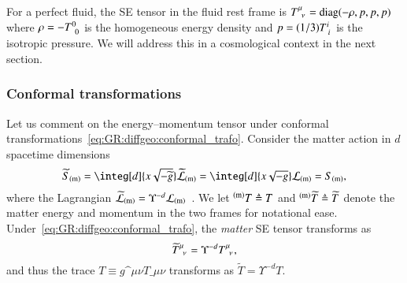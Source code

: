    For a perfect fluid, the SE tensor in the fluid rest frame is $T\indices{^\mu_\nu}= \text{diag}(-\rho, p, p, p)$ where $\rho=-T\iud{0}{0}$ is the homogeneous energy density and $p= (1/3) T\iud{i}{i}$ is the isotropic pressure. We will address this in a cosmological context in the next section.


    \subsubsection{Conformal transformations}
        {
        \newcommand\cfac{\Upsilon}
        \newcommand\wt{\widetilde}
        Let us comment on the energy--momentum tensor under conformal transformations~\cref{eq:GR:diffgeo:conformal_trafo}. Consider the matter action in $d$ spacetime dimensions
        \begin{equation}\label{eq:GR:einstein:matter_action_conformal}
            \widetilde{S}\ped{(m)} = \integ[d]{x\sqrt{-\wt{g}}} \wt{\mathcal{L}}\ped{(m)} = \integ[d]{x\sqrt{-g}} \mathcal{L}\ped{(m)} = S\ped{(m)},
        \end{equation}
        where the Lagrangian $\wt{\mathcal{L}}\ped{(m)}=\Upsilon^{-d}\mathcal{L}\ped{(m)}$~\citep{dabrowskiConformalTransformationsConformal2009}. %
        We let ${}^\mathrm{(m)}T\triangleq T$ and ${}\ap{(m)}\wt{T}\tmpequiv \wt{T}$ denote the matter energy and momentum in the two frames for notational ease. %
        Under~\cref{eq:GR:diffgeo:conformal_trafo}, the \emph{matter} SE tensor transforms as
        \begin{equation}
            {\wt{T}\indices{^\mu_\nu} }= \cfac^{-d}{T\indices{^\mu_\nu}},
        \end{equation}
        and thus the trace $T \equiv g\^{\mu\nu}{T\_{\mu\nu}}$ transforms as $ \wt{T} = \cfac^{-d} T$. %

}
